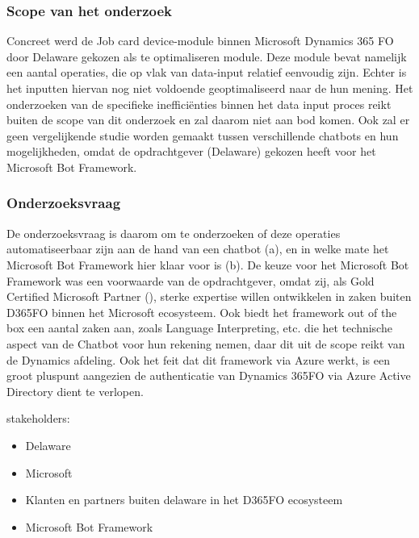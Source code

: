 \subsubsection{Scope van het onderzoek}
Concreet werd de Job card device-module binnen Microsoft Dynamics 365 FO door Delaware gekozen als te optimaliseren module. Deze module bevat namelijk een aantal operaties, die op vlak van data-input relatief eenvoudig zijn. Echter is het inputten hiervan nog niet voldoende geoptimaliseerd naar de hun mening. Het onderzoeken van de specifieke inefficiënties binnen het data input proces reikt buiten de scope van dit onderzoek en zal daarom niet aan bod komen. Ook zal er geen vergelijkende studie worden gemaakt tussen verschillende chatbots en hun mogelijkheden, omdat de opdrachtgever (Delaware) gekozen heeft voor het Microsoft Bot Framework. 

\subsubsection{Onderzoeksvraag}
De onderzoeksvraag is daarom om te onderzoeken of deze operaties automatiseerbaar zijn aan de hand van een chatbot (a), en in welke mate het Microsoft Bot Framework hier klaar voor is (b). De keuze voor het Microsoft Bot Framework was een voorwaarde van de opdrachtgever, omdat zij, als Gold Certified Microsoft Partner (\textcite{Delaware2009}), sterke expertise willen ontwikkelen in zaken buiten D365FO binnen het Microsoft ecosysteem. Ook biedt het framework out of the box een aantal zaken aan, zoals Language Interpreting, etc. die het technische aspect van de Chatbot voor hun rekening nemen, daar dit uit de scope reikt van de Dynamics afdeling. Ook het feit dat dit framework via Azure werkt, is een groot pluspunt aangezien de authenticatie van Dynamics 365FO via Azure Active Directory dient te verlopen. 



stakeholders:
\begin{itemize}
    \item Delaware
    \item Microsoft 
    \item Klanten en partners buiten delaware in het D365FO ecosysteem \item Microsoft Bot Framework
\end{itemize}


